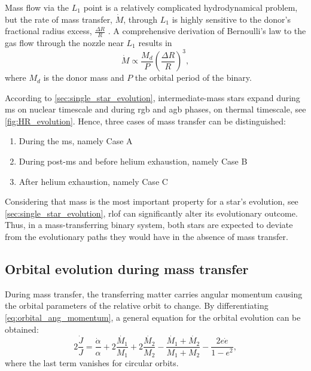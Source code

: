 Mass flow via the $L_1$ point is a relatively complicated hydrodynamical problem, but the rate of mass transfer, $\dot{M}$, through $L_1$ is highly sensitive to the donor's fractional radius excess, $\frac{\Delta R}{R}$ . A comprehensive derivation of Bernoulli's law to the gas flow through the nozzle near $L_1$ results in 
\begin{equation}\label{eq:mass_loss_rate_anal}
    \dot{M} \propto \frac{M_{d}}{P} \left( \frac{\Delta R}{R}\right)^3,
\end{equation}
where $M_{d}$ is the donor mass and $P$ the orbital period of the binary.

According to \cref{sec:single_star_evolution}, intermediate-mass stars expand during \ac{ms} on nuclear timescale and during \ac{rgb} and \ac{agb} phases, on thermal timescale, see \cref{fig:HR_evolution}.  Hence, three cases of mass transfer can be distinguished:
\begin{enumerate}
    \item During the \ac{ms}, namely Case A
    \item During post-\ac{ms} and before helium exhaustion, namely Case B
    \item After helium exhaustion, namely Case C
\end{enumerate}
Considering that mass is the most important property for a star's evolution, see \cref{sec:single_star_evolution}, \ac{rlof} can significantly alter its evolutionary outcome.  
Thus, in a mass-transferring binary system, both stars are expected to deviate from the evolutionary paths they would have in the absence of mass transfer.

\subsection{Orbital evolution during mass transfer}\label{sub:orbit_evol_mass_loss}

During mass transfer, the transferring matter carries angular momentum causing the orbital parameters of the relative orbit to change. By differentiating \cref{eq:orbital_ang_momentum}, a general equation for the orbital evolution can be obtained:
\begin{equation}\label{eq:orb_ang_momen_derivative}
    2\frac{\dot{J}}{J} = \frac{\dot{\alpha}}{\alpha} + 2 \frac{\dot{M_1}}{M_1} + 2 \frac{\dot{M_2}}{M_2} - \frac{ \dot{M_1} + \dot{M_2}}{M_1 + M_2} - \frac{2e \dot{e}}{1-e^2},
\end{equation}
where the last term vanishes for circular orbits.

